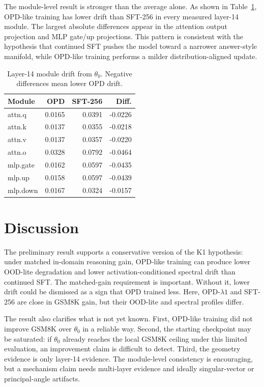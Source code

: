 \documentclass[letterpaper]{article}
\begin{document}
The module-level result is stronger than the average alone.
As shown in Table~\ref{tab:module_drift}, OPD-like training has lower drift than SFT-256 in every measured layer-14 module.
The largest absolute differences appear in the attention output projection and MLP gate/up projections.
This pattern is consistent with the hypothesis that continued SFT pushes the model toward a narrower answer-style manifold, while OPD-like training performs a milder distribution-aligned update.

\begin{table}[t]
\centering
\small
\begin{tabular}{lrrr}
\toprule
Module & OPD & SFT-256 & Diff. \\
\midrule
attn.q & 0.0165 & 0.0391 & -0.0226 \\
attn.k & 0.0137 & 0.0355 & -0.0218 \\
attn.v & 0.0137 & 0.0357 & -0.0220 \\
attn.o & 0.0328 & 0.0792 & -0.0464 \\
mlp.gate & 0.0162 & 0.0597 & -0.0435 \\
mlp.up & 0.0158 & 0.0597 & -0.0439 \\
mlp.down & 0.0167 & 0.0324 & -0.0157 \\
\bottomrule
\end{tabular}
\caption{Layer-14 module drift from $\theta_0$. Negative differences mean lower OPD drift.}
\label{tab:module_drift}
\end{table}

\section{Discussion}

The preliminary result supports a conservative version of the K1 hypothesis:
under matched in-domain reasoning gain, OPD-like training can produce lower OOD-lite degradation and lower activation-conditioned spectral drift than continued SFT.
The matched-gain requirement is important.
Without it, lower drift could be dismissed as a sign that OPD trained less.
Here, OPD-$\lambda1$ and SFT-256 are close in GSM8K gain, but their OOD-lite and spectral profiles differ.

The result also clarifies what is not yet known.
First, OPD-like training did not improve GSM8K over $\theta_0$ in a reliable way.
Second, the starting checkpoint may be saturated: if $\theta_0$ already reaches the local GSM8K ceiling under this limited evaluation, an improvement claim is difficult to detect.
Third, the geometry evidence is only layer-14 evidence.
The module-level consistency is encouraging, but a mechanism claim needs multi-layer evidence and ideally singular-vector or principal-angle artifacts.
\end{document}
